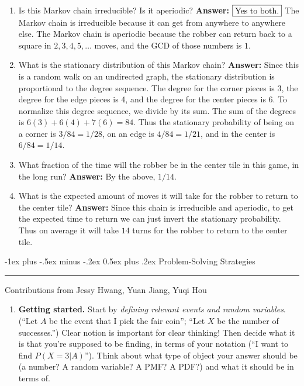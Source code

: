 \documentclass[10pt,landscape]{article}
\makeatletter
\renewcommand{\section}{\@startsection{section}{1}{0mm}%
                                {-1ex plus -.5ex minus -.2ex}%
                                {0.5ex plus .2ex}%
                                {\normalfont\large\bfseries}}
\makeatother
\begin{document}
\begin{multicols*}{3}
\begin{enumerate}[label=(\alph*)]
    \item Is this Markov chain irreducible? Is it aperiodic? \textbf{Answer:} $\boxed{\textnormal{Yes to both.}}$ The Markov chain is irreducible because it can get from anywhere to anywhere else. The Markov chain is  aperiodic because the robber can return back to a square in $2, 3, 4, 5, \dots$ moves, and the GCD of those numbers is $1$.
        \item What is the stationary distribution of this Markov chain? \textbf{Answer:} Since this is a random walk on an undirected graph, the stationary distribution is proportional to the degree sequence. The degree for the corner pieces is 3, the degree for the edge pieces is 4, and the degree for the center pieces is 6. To normalize this degree sequence, we divide by its sum. The sum of the degrees is $6(3) + 6(4) + 7(6) = 84$. Thus the stationary probability of being on a corner is $3/84 = 1/28$, on an edge is $4/84 =  1/21$, and in the center is $6/84 = 1/14$.
    \item What fraction of the time will the robber be in the center tile in this game, in the long run? \textbf{Answer:} By the above, $\boxed{1/14}$.
    \item What is the expected amount of moves it will take for the robber to return to the center tile? \textbf{Answer:} Since this chain is irreducible and aperiodic, to get the expected time to return we can just invert the stationary probability. Thus on average it will take $\boxed{14}$ turns for the robber to return to the center tile.
\end{enumerate}


\section{Problem-Solving Strategies} \smallskip \hrule height 2pt \smallskip

Contributions from Jessy Hwang, Yuan Jiang, Yuqi Hou
\begin{enumerate}
\item \textbf{Getting started.} Start by \emph{defining relevant events and random variables}. (``Let $A$ be the event that I pick the fair coin''; ``Let $X$ be the number of successes.'') Clear notion is important for clear thinking! Then decide what it is that you're supposed to be finding, in terms of your notation (``I want to find $P(X=3|A)$''). Think about what type of object your answer should be (a number? A random variable? A PMF? A PDF?) and what it should be in terms of.


\end{enumerate}
\end{multicols*}
\end{document}
